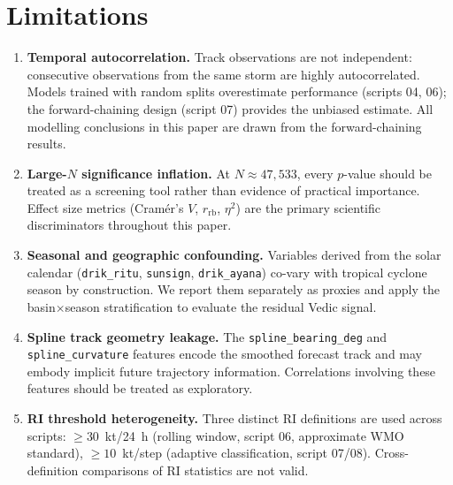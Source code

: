 \documentclass[12pt,a4paper]{article}
\begin{document}
\section{Limitations}
\label{sec:limitations}

\begin{enumerate}

  \item \textbf{Temporal autocorrelation.}
    Track observations are not independent: consecutive observations from the
    same storm are highly autocorrelated.
    Models trained with random splits overestimate performance (scripts 04, 06);
    the forward-chaining design (script 07) provides the unbiased estimate.
    All modelling conclusions in this paper are drawn from the forward-chaining
    results.

  \item \textbf{Large-$N$ significance inflation.}
    At $N \approx 47{,}533$, every $p$-value should be treated as a screening
    tool rather than evidence of practical importance.
    Effect size metrics (Cram\'er's $V$, $r_\text{rb}$, $\eta^2$) are the
    primary scientific discriminators throughout this paper.

  \item \textbf{Seasonal and geographic confounding.}
    Variables derived from the solar calendar (\texttt{drik\_ritu},
    \texttt{sunsign}, \texttt{drik\_ayana}) co-vary with tropical cyclone season
    by construction.
    We report them separately as proxies and apply the basin$\times$season
    stratification to evaluate the residual Vedic signal.

  \item \textbf{Spline track geometry leakage.}
    The \texttt{spline\_bearing\_deg} and \texttt{spline\_curvature} features
    encode the smoothed forecast track and may embody implicit future trajectory
    information.
    Correlations involving these features should be treated as exploratory.

  \item \textbf{RI threshold heterogeneity.}
    Three distinct RI definitions are used across scripts:
    $\geq 30$~kt/24~h (rolling window, script 06, approximate WMO standard),
    $\geq 10$~kt/step (adaptive classification, script 07/08).
    Cross-definition comparisons of RI statistics are not valid.


\end{enumerate}
\end{document}
